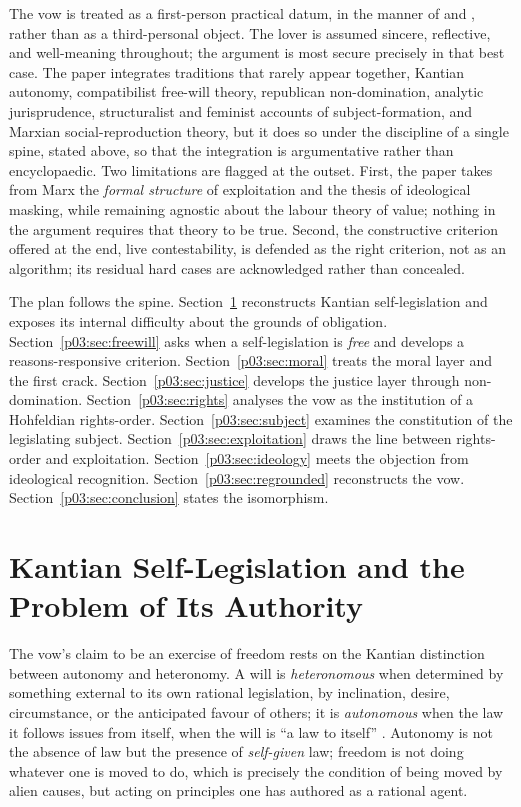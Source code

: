 The vow is treated as a first-person practical datum, in the manner of \textcite{frankfurt2004reasons} and \textcite{velleman1999love}, rather than as a third-personal object. The lover is assumed sincere, reflective, and well-meaning throughout; the argument is most secure precisely in that best case. The paper integrates traditions that rarely appear together, Kantian autonomy, compatibilist free-will theory, republican non-domination, analytic jurisprudence, structuralist and feminist accounts of subject-formation, and Marxian social-reproduction theory, but it does so under the discipline of a single spine, stated above, so that the integration is argumentative rather than encyclopaedic. Two limitations are flagged at the outset. First, the paper takes from Marx the \emph{formal structure} of exploitation and the thesis of ideological masking, while remaining agnostic about the labour theory of value; nothing in the argument requires that theory to be true. Second, the constructive criterion offered at the end, live contestability, is defended as the right criterion, not as an algorithm; its residual hard cases are acknowledged rather than concealed.

The plan follows the spine. Section~\ref{p03:sec:kant} reconstructs Kantian self-legislation and exposes its internal difficulty about the grounds of obligation. Section~\ref{p03:sec:freewill} asks when a self-legislation is \emph{free} and develops a reasons-responsive criterion. Section~\ref{p03:sec:moral} treats the moral layer and the first crack. Section~\ref{p03:sec:justice} develops the justice layer through non-domination. Section~\ref{p03:sec:rights} analyses the vow as the institution of a Hohfeldian rights-order. Section~\ref{p03:sec:subject} examines the constitution of the legislating subject. Section~\ref{p03:sec:exploitation} draws the line between rights-order and exploitation. Section~\ref{p03:sec:ideology} meets the objection from ideological recognition. Section~\ref{p03:sec:regrounded} reconstructs the vow. Section~\ref{p03:sec:conclusion} states the isomorphism.

\section{Kantian Self-Legislation and the Problem of Its Authority}\label{p03:sec:kant}

The vow's claim to be an exercise of freedom rests on the Kantian distinction between autonomy and heteronomy. A will is \emph{heteronomous} when determined by something external to its own rational legislation, by inclination, desire, circumstance, or the anticipated favour of others; it is \emph{autonomous} when the law it follows issues from itself, when the will is ``a law to itself'' \parencite[4:440]{kant1785groundwork}. Autonomy is not the absence of law but the presence of \emph{self-given} law; freedom is not doing whatever one is moved to do, which is precisely the condition of being moved by alien causes, but acting on principles one has authored as a rational agent.

